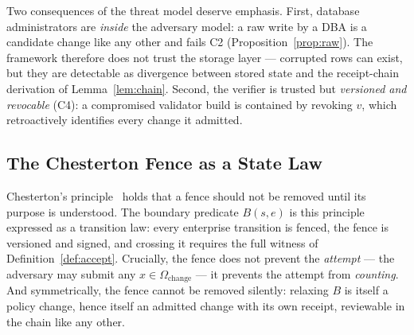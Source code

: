 Two consequences of the threat model deserve emphasis. First, database
administrators are \emph{inside} the adversary model: a raw write by a DBA is a
candidate change like any other and fails C2
(Proposition~\ref{prop:raw}). The framework therefore does not trust the
storage layer --- corrupted rows can exist, but they are detectable as
divergence between stored state and the receipt-chain derivation of
Lemma~\ref{lem:chain}. Second, the verifier is trusted but \emph{versioned and
revocable} (C4): a compromised validator build is contained by revoking $v$,
which retroactively identifies every change it admitted.

\subsection{The Chesterton Fence as a State Law}

Chesterton's principle~\cite{chesterton_orthodoxy_1908} holds that a fence
should not be removed until its purpose is understood. The boundary predicate
$B(s,e)$ is this principle expressed as a transition law: every enterprise
transition is fenced, the fence is versioned and signed, and crossing it
requires the full witness of Definition~\ref{def:accept}. Crucially, the fence
does not prevent the \emph{attempt} --- the adversary may submit any
$x \in \Omega_{\mathrm{change}}$ --- it prevents the attempt from
\emph{counting}. And symmetrically, the fence cannot be removed silently:
relaxing $B$ is itself a policy change, hence itself an admitted change with
its own receipt, reviewable in the chain like any other.
